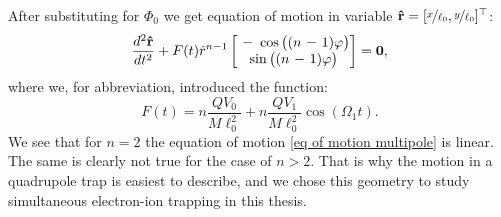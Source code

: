 After substituting for $\Phi_0$ we get equation of motion in variable $\vb{\hat{r}} = [\nicefrac{x}{\ell_0},\nicefrac{y}{\ell_0}]^\top$:
\begin{equation}
	\label{eq of motion multipole}
	\dfrac{d^2\vb{\hat{r}}}{dt^2} + F(t) \hat{r}^{n-1}
	\begin{bmatrix}
		\minus\cos\big((n \minus 1)\varphi\big) \\
		\sin\big((n \minus 1)\varphi\big)
	\end{bmatrix} = \vb{0},
\end{equation}
where we, for abbreviation, introduced the function:
\begin{equation}
	F(t) = n\dfrac{Q V_0}{M \ell_0^2} + n\dfrac{Q V_1}{M \ell_0^2} \cos(\Omega_1 t).
\end{equation}
We see that for $n = 2$ the equation of motion \eqref{eq of motion multipole} is linear. The same is clearly not true for the case of $n > 2$. That is why the motion in a quadrupole trap is easiest to describe, and we chose this geometry to study simultaneous electron-ion trapping in this thesis.

